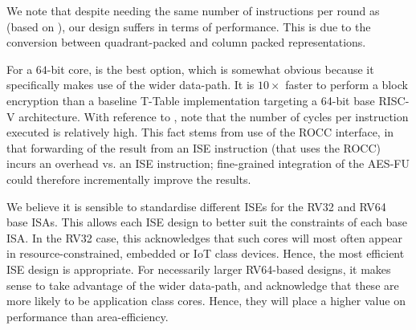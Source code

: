 We note that despite needing the same number of instructions per round
as  (based on \cite{TilGroSze:05}), our  design suffers in terms
of performance.
This is due to the conversion between quadrant-packed and column packed
representations.

For a $64$-bit core,
is the best option, which is somewhat obvious because it specifically makes
use of the wider data-path.
It is $10\times$ faster to perform a block encryption than a baseline T-Table
implementation targeting a 64-bit base RISC-V architecture.
With reference to
, 
note that the number of cycles per instruction executed is relatively high.
This fact stems from use of the ROCC interface, in that forwarding of the 
result from an ISE instruction (that uses the ROCC) incurs an overhead vs. 
an ISE instruction; fine-grained integration of the AES-FU could therefore
incrementally improve the results.

We believe it is sensible to standardise different ISEs for the
RV32 and RV64 base ISAs.
This allows each ISE design to better suit the constraints of each
base ISA.
In the RV32 case, this acknowledges that such cores will most often
appear in resource-constrained, embedded or IoT class devices.
Hence, the most efficient ISE design is appropriate.
For necessarily larger RV64-based designs, it makes sense to take advantage
of the wider data-path, and acknowledge that these are more likely to
be application class cores. Hence, they will place a higher value
on performance than area-efficiency.


